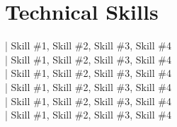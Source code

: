 \section{Technical Skills}
\vspace{-10pt}
\small
\begin{multicols}{2}
     | Skill \#1, Skill \#2, Skill \#3, Skill \#4 \\
     | Skill \#1, Skill \#2, Skill \#3, Skill \#4 \\
     | Skill \#1, Skill \#2, Skill \#3, Skill \#4 \\
    \columnbreak
     | Skill \#1, Skill \#2, Skill \#3, Skill \#4 \\
     | Skill \#1, Skill \#2, Skill \#3, Skill \#4 \\
     | Skill \#1, Skill \#2, Skill \#3, Skill \#4 \\
\end{multicols}